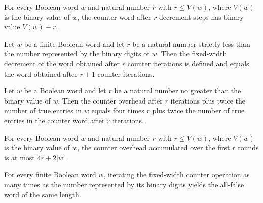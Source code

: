\begin{theorem}
\label{Turing.counterWord_value}
\leanok
{}
For every Boolean word $w$ and natural number $r$ with $r\le V(w)$, where $V(w)$ is the
binary value of $w$, the counter word after $r$ decrement steps has binary value
$V(w)-r$.
\end{theorem}

\begin{lemma}
\label{Turing.counter_word_decrement}
\leanok
{}
Let $w$ be a finite Boolean word and let $r$ be a natural number strictly less than the
number represented by the binary digits of $w$. Then the fixed-width decrement of the
word obtained after $r$ counter iterations is defined and equals the word obtained after
$r+1$ counter iterations.
\end{lemma}

\begin{lemma}
\label{Turing.counter_potential}
\leanok
{}
Let $w$ be a Boolean word and let $r$ be a natural number no greater than the binary
value of $w$. Then the counter overhead after $r$ iterations plus twice the number of
true entries in $w$ equals four times $r$ plus twice the number of true entries in the
counter word after $r$ iterations.
\end{lemma}

\begin{theorem}
\label{Turing.counterOverhead_le_of_le}
\leanok
{}
For every Boolean word $w$ and natural number $r$ with $r\le V(w)$, where $V(w)$ is the
binary value of $w$, the counter overhead accumulated over the first $r$ rounds is at
most $4r+2|w|$.
\end{theorem}

\begin{lemma}
\label{Turing.counter_word_exhausted}
\leanok
{}
For every finite Boolean word $w$, iterating the fixed-width counter operation as many
times as the number represented by its binary digits yields the all-false word of the
same length.
\end{lemma}

